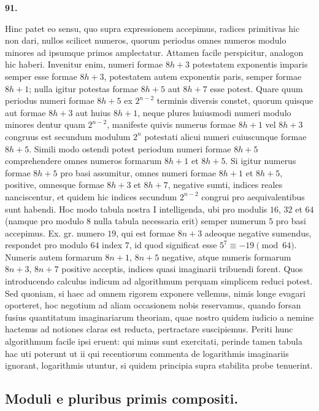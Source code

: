 \documentclass[12pt,a4paper]{article}
\theoremstyle{plain}
\theoremstyle{definition}
\theoremstyle{remark}
\begin{document}
\setcounter{satz}{91}
\addtocounter{satz}{-1}
\textbf{91.}

Hinc patet eo sensu, quo supra expressionem accepimus, radices primitivas hic non dari, nullos scilicet numeros, quorum periodus omnes numeros modulo minores ad ipsumque primos amplectatur. Attamen facile perspicitur, analogon hic haberi. Invenitur enim, numeri formae $8h+3$ potestatem exponentis imparis semper esse formae $8h+3$, potestatem autem exponentis paris, semper formae $8h+1$; nulla igitur potestas formae $8h+5$ aut $8h+7$ esse potest. Quare quum periodus numeri formae $8h+5$ ex $2^{n-2}$ terminis diversis constet, quorum quisque aut formae $8h+3$ aut huius $8h+1$, neque plures huiusmodi numeri modulo minores dentur quam $2^{n-2}$, manifeste quivis numerus formae $8h+1$ vel $8h+3$ congruus est secundum modulum $2^n$ potestati alicui numeri cuiuscunque formae $8h+5$. Simili modo ostendi potest periodum numeri formae $8h+5$ comprehendere omnes numeros formarum $8h+1$ et $8h+5$. Si igitur numerus formae $8h+5$ pro basi assumitur, omnes numeri formae $8h+1$ et $8h+5$, positive, omnesque formae $8h+3$ et $8h+7$, negative sumti, indices reales nanciscentur, et quidem hic indices secundum $2^{n-2}$ congrui pro aequivalentibus sunt habendi. Hoc modo tabula nostra I intelligenda, ubi pro modulis $16$, $32$ et $64$ (namque pro modulo $8$ nulla tabula necessaria erit) semper numerum $5$ pro basi accepimus. Ex. gr. numero $19$, qui est formae $8n+3$ adeoque negative sumendus, respondet pro modulo $64$ index $7$, id quod significat esse $5^7 \equiv -19 \pmod{64}$. Numeris autem formarum $8n+1$, $8n+5$ negative, atque numeris formarum $8n+3$, $8n+7$ positive acceptis, indices quasi imaginarii tribuendi forent. Quos introducendo calculus indicum ad algorithmum perquam simplicem reduci potest. Sed quoniam, si haec ad omnem rigorem exponere vellemus, nimis longe evagari oporteret, hoc negotium ad aliam occasionem nobis reservamus, quando forsan fusius quantitatum imaginariarum theoriam, quae nostro quidem iudicio a nemine hactenus ad notiones claras est reducta, pertractare suscipiemus. Periti hunc algorithmum facile ipsi eruent: qui minus sunt exercitati, perinde tamen tabula hac uti poterunt ut ii qui recentiorum commenta de logarithmis imaginariis ignorant, logarithmis utuntur, si quidem principia supra stabilita probe tenuerint.

\subsection*{Moduli e pluribus primis compositi.}
\end{document}

